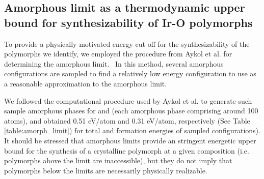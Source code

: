 \subsection{Amorphous limit as a thermodynamic upper bound for synthesizability of Ir-O polymorphs}
%

%
%
To provide a physically motivated energy cut-off for the synthesizability of the polymorphs we identify, we employed the procedure from Aykol et al. for determining the amorphous limit.~\cite{Aykol2018}
%
In this method, several amorphous configurations are sampled to find a relatively low energy configuration to use as a reasonable approximation to the amorphous limit.
%
\begin{table}
\centering
\caption{\label{table:amorph_limit}
%
Density functional theory computed energetics of sampled amorphous phases for \IrOtwo and \IrOthree as per the procedure of Aykol ~\cite{Aykol2018}.
%
Here we report the raw DFT electronic energy per atom ($E_{DFT}$),
the enthalpy of formation (\DHf),
and the energy above the hull relative to the most stable polymorph of each stoichiometry (\rIrOtwo and \aIrOthree).
%
The most stable amorphous phase for each stoichiometry is bolded.
}

\end{table}
We followed the computational procedure used by Aykol et al. to generate such sample amorphous phases for \IrOtwo and \IrOthree
(each amorphous phase comprising around 100 atoms),
and obtained 0.51 eV/atom and 0.31 eV/atom, respectively
(See Table \ref{table:amorph_limit}) for total and formation energies of sampled configurations).
%
It should be stressed that amorphous limits provide an stringent energetic upper bound for the synthesis of a crystalline polymorph at a given composition (i.e. polymorphs above the limit are inaccessible),
but they do not imply that polymorphs below the limits are necessarily physically realizable.


